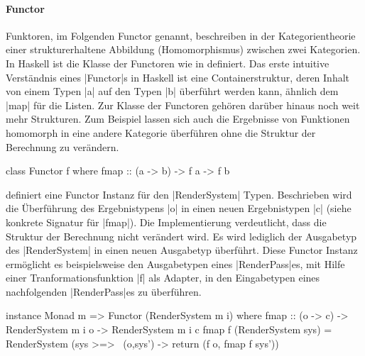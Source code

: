 
\paragraph{Functor} 
Funktoren, im Folgenden Functor genannt, beschreiben in der Kategorientheorie einer strukturerhaltene Abbildung (Homomorphismus) zwischen zwei Kategorien. In Haskell ist die Klasse der Functoren wie in  definiert. Das erste intuitive Verständnis eines |Functor|s in Haskell ist eine Containerstruktur, deren Inhalt von einem Typen |a| auf den Typen |b| überführt werden kann, ähnlich dem |map| für die Listen. Zur Klasse der Functoren gehören darüber hinaus noch weit mehr Strukturen. Zum Beispiel lassen sich auch die Ergebnisse von Funktionen homomorph in eine andere Kategorie überführen ohne die Struktur der Berechnung zu verändern.

\begin{haskell}[label={lst:class-functor},caption={Functor Klasse\protect\footnotemark},nolol]
class Functor f where
  fmap :: (a -> b) -> f a -> f b 
\end{haskell}

 definiert eine Functor Instanz für den |RenderSystem| Typen. Beschrieben wird die Überführung des Ergebnistypens |o| in einen neuen Ergebnistypen |c| (siehe konkrete Signatur für |fmap|). Die Implementierung verdeutlicht, dass die Struktur der Berechnung nicht verändert wird. Es wird lediglich der Ausgabetyp des \linebreak|RenderSystem| in einen neuen Ausgabetyp überführt. Diese Functor Instanz ermöglicht es beispielsweise den Ausgabetypen eines |RenderPass|es, mit Hilfe einer Tranformationsfunktion |f| als Adapter, in den Eingabetypen eines nachfolgenden \linebreak|RenderPass|es zu überführen.

\begin{haskell}[label={lst:rendersystem-functor},caption={Functor Instanz für RenderSystem}]
instance Monad m => Functor (RenderSystem m i) where
  fmap :: (o -> c) -> RenderSystem m i o -> RenderSystem m i c
  fmap f (RenderSystem sys) = RenderSystem (sys >=> \ (o,sys') -> return (f o, fmap f sys'))
\end{haskell}



